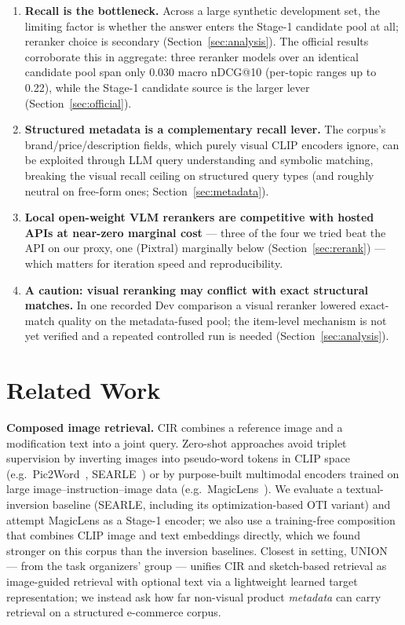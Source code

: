 \documentclass[sigconf,nonacm]{acmart}
\begin{document}
\begin{enumerate}
\item \textbf{Recall is the bottleneck.} Across a large synthetic
development set, the limiting factor is whether the answer enters the
Stage-1 candidate pool at all; reranker choice is secondary
(Section~\ref{sec:analysis}). The official results corroborate this in
aggregate: three reranker models over an identical candidate pool span only
0.030 macro nDCG@10 (per-topic ranges up to 0.22), while the Stage-1 candidate
source is the larger lever (Section~\ref{sec:official}).
\item \textbf{Structured metadata is a complementary recall lever.} The
corpus's brand/price/description fields, which purely visual CLIP encoders
ignore, can be exploited through LLM query understanding and symbolic
matching, breaking the visual recall ceiling on structured query types
(and roughly neutral on free-form ones; Section~\ref{sec:metadata}).
\item \textbf{Local open-weight VLM rerankers are competitive with hosted
APIs at near-zero marginal cost} --- three of the four we tried beat the API
on our proxy, one (Pixtral) marginally below (Section~\ref{sec:rerank}) ---
which matters for iteration speed and reproducibility.
\item \textbf{A caution: visual reranking may conflict with exact structural
matches.} In one recorded Dev comparison a visual reranker lowered exact-match
quality on the metadata-fused pool; the item-level mechanism is not yet
verified and a repeated controlled run is needed (Section~\ref{sec:analysis}).
\end{enumerate}

\section{Related Work}
\textbf{Composed image retrieval.} CIR combines a reference image and a
modification text into a joint query. Zero-shot approaches avoid triplet
supervision by inverting images into pseudo-word tokens in CLIP space
(e.g.\ Pic2Word~\cite{pic2word}, SEARLE~\cite{searle}) or by purpose-built
multimodal encoders trained on large image--instruction--image data
(e.g.\ MagicLens~\cite{magiclens}). We evaluate a
textual-inversion baseline (SEARLE, including its optimization-based OTI
variant) and attempt MagicLens as a Stage-1 encoder; we also use a
training-free composition that combines CLIP image and text embeddings
directly, which we found stronger on this corpus than the inversion
baselines. Closest in setting, UNION~\cite{union} --- from the task
organizers' group --- unifies CIR and sketch-based retrieval as image-guided
retrieval with optional text via a lightweight learned target representation;
we instead ask how far non-visual product \emph{metadata} can carry retrieval
on a structured e-commerce corpus.
\end{document}
